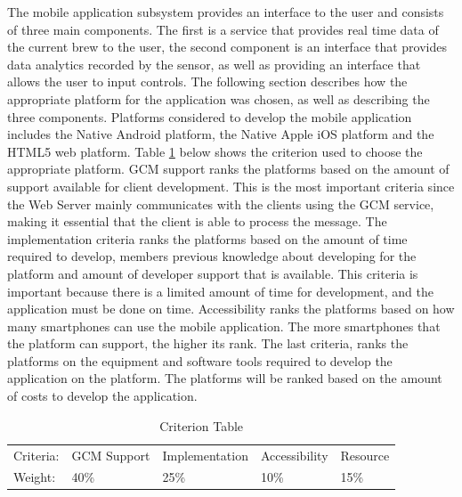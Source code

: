 \documentclass{article}
\begin{document}

\noindent The mobile application subsystem provides an interface to the user and consists of three main components. The first is a service that provides real time data of the current brew to the user, the second component is an interface that provides data analytics recorded by the sensor, as well as providing an interface that allows the user to input controls. The following section describes how the appropriate platform for the application was chosen, as well as describing the three components.
Platforms considered to develop the mobile application includes the Native Android platform, the Native Apple iOS platform and the HTML5 web platform. Table \ref{tab:criterion-table} below shows the criterion used to choose the appropriate platform. GCM support ranks the platforms based on the amount of support available for client development. This is the most important criteria since the Web Server mainly communicates with the clients using the GCM service, making it essential that the client is able to process the message. The implementation criteria ranks the platforms based on the amount of time required to develop, members previous knowledge about developing for the platform and amount of developer support that is available. This criteria is important because there is a limited amount of time for development, and the application must be done on time. Accessibility ranks the platforms based on how many smartphones can use the mobile application. The more smartphones that the platform can support, the higher its rank. The last criteria, ranks the platforms on the equipment and software tools required to develop the application on the platform. The platforms will be ranked based on the amount of costs to develop the application.

\begin{table}[H]
\centering
\caption{Criterion Table}
\label{tab:criterion-table}
\begin{tabular}{lllll}
Criteria: & GCM Support & Implementation & Accessibility & Resource \\
Weight:   & 40\%        & 25\%           & 10\%          & 15\%    
\end{tabular}
\end{table}
\end{document}
